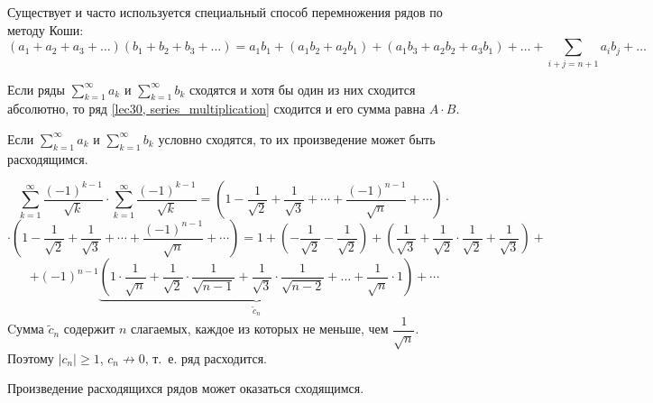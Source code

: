 \documentclass[../../main.tex]{subfiles}
\begin{document}
Существует и часто используется специальный способ перемножения рядов по 
методу Коши:
\[(a_1 + a_2 + a_3 + \ldots)(b_1 + b_2 + b_3 + \ldots) = a_1 b_1 +
(a_1 b_2 + a_2 b_1) + (a_1 b_3 + a_2 b_2 + a_3 b_1) + \ldots +
\sum\limits_{i + j = n + 1} a_i b_j + \ldots\]
\begin{thm}[Мертенс]
Если ряды $\sum\limits_{k = 1}^{\infty} a_k$ и
$\sum\limits_{k = 1}^{\infty} b_k$ сходятся и хотя бы один из них
сходится абсолютно, то ряд \eqref{lec30, series_multiplication} сходится
и его сумма равна $A \cdot B$.
\end{thm}

Если $\sum\limits_{k = 1}^{\infty} a_k$ и
$\sum\limits_{k = 1}^{\infty} b_k$ условно сходятся, то их произведение
может быть расходящимся.
\begin{example}
	\[\sum\limits_{k = 1}^{\infty} \frac{(-1)^{k-1}}{\sqrt{k}} \cdot
	\sum\limits_{k = 1}^{\infty} \frac{(-1)^{k-1}}{\sqrt{k}} =
	\left(1 - \frac{1}{\sqrt{2}} + \frac{1}{\sqrt{3}} + \cdots +
	\frac{(-1)^{n-1}}{\sqrt{n}} + \cdots \right) \cdot \]
	\[\cdot \left(1 - \frac{1}{\sqrt{2}} + \frac{1}{\sqrt{3}} + \cdots +
	\frac{(-1)^{n-1}}{\sqrt{n}} + \cdots \right) = 1 +
	\left( - \frac{1}{\sqrt{2}} - \frac{1}{\sqrt{2}} \right) +
	\left( \frac{1}{\sqrt{3}} + \frac{1}{\sqrt{2}} \cdot
	\frac{1}{\sqrt{2}} + \frac{1}{\sqrt{3}} \right) + \] 
	\[ + \left( -1 \right) ^ {n - 1}
	\underbrace{\left(1 \cdot \frac{1}{\sqrt{n}} + \frac{1}{\sqrt{2}} \cdot
	\frac{1}{\sqrt{n - 1}} + \frac{1}{\sqrt{3}} \cdot
	\frac{1}{\sqrt{n - 2}} + \ldots + \frac{1}{\sqrt{n}}
	\cdot 1\right)}_{\widetilde{c}_n} + \cdots \]
	Cумма $\widetilde{c}_n$ содержит $n$ слагаемых, каждое из которых не меньше,
	чем $\dfrac{1}{\sqrt{n}}$. Поэтому $|c_n| \geq 1$, $c_n \not\to 0$, т.~е.
	ряд расходится.
\end{example}
\begin{remark}
	Произведение расходящихся рядов может оказаться сходящимся.
\end{remark}
\end{document}
